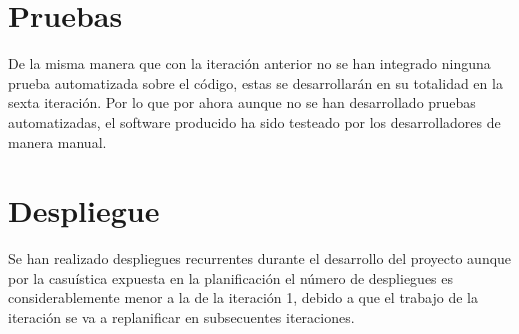 
\clearpage

\section{Pruebas}

De la misma manera que con la iteración anterior no se han integrado ninguna prueba automatizada sobre el código, estas se desarrollarán en su totalidad en la sexta iteración. Por lo que por ahora aunque no se han desarrollado pruebas automatizadas, el software producido ha sido testeado por los desarrolladores de manera manual.

\section{Despliegue}
Se han realizado despliegues recurrentes durante el desarrollo del proyecto aunque por la casuística expuesta en la planificación el número de despliegues es considerablemente menor a la de la iteración 1, debido a que el trabajo de la iteración se va a replanificar en subsecuentes iteraciones.
